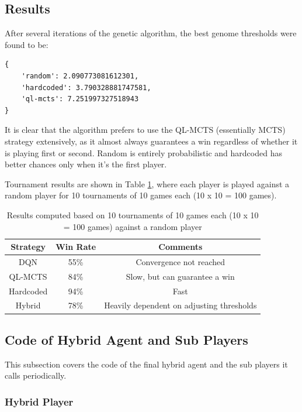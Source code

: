 \subsection{Results}

After several iterations of the genetic algorithm, the best genome thresholds were found to be:

\begin{verbatim}
{
    'random': 2.090773081612301,
    'hardcoded': 3.790328881747581,
    'ql-mcts': 7.251997327518943
}
\end{verbatim}

It is clear that the algorithm prefers to use the QL-MCTS (essentially MCTS) strategy extensively, as it almost always guarantees a win regardless of whether it is playing first or second. Random is entirely probabilistic and hardcoded has better chances only when it's the first player.

Tournament results are shown in Table \ref{results}, where each player is played against a random player for 10 tournaments of 10 games each (10 x 10 = 100 games).

\begin{table}[h]
    \centering
    \begin{tabular}{|c|c|c|}
        \hline
        \textbf{Strategy} & \textbf{Win Rate} & \textbf{Comments} \\ \hline
        DQN & 55\% & Convergence not reached \\ \hline
        QL-MCTS & 84\% & Slow, but can guarantee a win \\ \hline
        Hardcoded & 94\% & Fast \\ \hline
        Hybrid & 78\% & Heavily dependent on adjusting thresholds \\ \hline
    \end{tabular}
    \caption{Results computed based on 10 tournaments of 10 games each (10 x 10 = 100 games) against a random player}
    \label{results}
\end{table}

\subsection{Code of Hybrid Agent and Sub Players}

This subsection covers the code of the final hybrid agent and the sub players it calls periodically.

\subsubsection{Hybrid Player}

